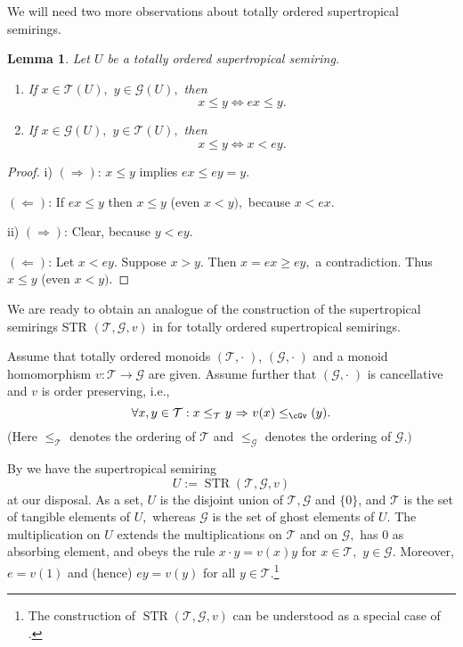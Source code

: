 \documentclass [12pt,a4paper,reqno]{amsart}
\newtheorem{lem}[thm]{Lemma}
\begin{document}
We will need two more observations about totally ordered
supertropical semirings.

\begin{lem}\label{lem3.4}
Let $U$ be a totally ordered supertropical semiring.
\begin{enumerate}
\item[i)] If $x\in {\mathcal T}(U),$ $y\in {\mathcal G}(U),$ then
$$x\le y \Leftrightarrow ex\le y.$$
\item[ii)] If $x\in {\mathcal G} (U),$ $y\in {\mathcal T}(U),$ then
$$x\le y\Leftrightarrow x<ey.$$\end{enumerate}\end{lem}

\begin{proof}
i) $(\Rightarrow)$: $x\le y$ implies $ex\le ey=y.$

$(\Leftarrow)$: If $ex\le y$ then $x\le y$ (even $x<y),$ because
$x<ex.$ {\vskip 1.5mm \noindent}

ii) $(\Rightarrow)$: Clear, because $y<ey.$

$(\Leftarrow)$: Let $x<ey.$ Suppose $x>y.$ Then $x=ex\ge ey,$ a
contradiction. Thus $x\le y$ (even $x<y).$
\end{proof}

We are ready to obtain an analogue of the construction of the
supertropical semirings STR $({\mathcal T},{\mathcal G} ,v)$ in \cite[Construction
3.16]{IKR1} for totally ordered supertropical semirings.

Assume that totally ordered monoids $(  {\mathcal T},\cdot \; )$, $({\mathcal G}
,\cdot \; )$ and a monoid homomorphism $v: {\mathcal T}\to {\mathcal G} $ are given.
Assume further that $({\mathcal G} ,\cdot \; )$ is cancellative and $v$ is
order preserving, i.e.,
$$\forall x,y\in {\mathcal T}:x\le_{\mathcal T} y{\ {\Rightarrow} \ } v(x)\le_\cGv(y).$$ (Here $\le_{\mathcal T}$ denotes the ordering of ${\mathcal T}$ and
$\le_{\mathcal G}$ denotes the ordering of ${\mathcal G} .)$

By \cite[Construction 3.16]{IKR1} we have the supertropical
semiring
$$U:=
{\operatorname{STR}}({\mathcal T},{\mathcal G} ,v)$$ at our disposal. As a set, $U$ is the disjoint
union of ${\mathcal T},{\mathcal G} $ and $\{0\}$, and ${\mathcal T}$ is the set of tangible
elements of $U,$ whereas ${\mathcal G} $ is the set of ghost elements of
$U.$ The multiplication on $U$ extends the multiplications on
${\mathcal T}$ and on ${\mathcal G} ,$ has 0 as absorbing element, and obeys the
rule $x\cdot y=v(x)y$ for $x\in {\mathcal T},$ $y\in{\mathcal G} .$ Moreover,
$e=v(1)$ and (hence) $ey=v(y)$ for all $y\in {\mathcal T}.$\footnote{The
construction of ${\operatorname{STR}}({\mathcal T},{\mathcal G} ,v)$ can be understood as  a special
case of \cite[Theorem 3.1]{IKR2}.}
\end{document}
